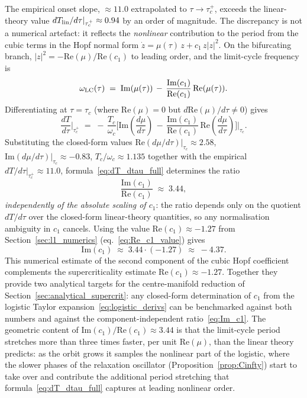 \documentclass[sn-mathphys,Numbered]{sn-jnl}
\theoremstyle{thmstyleone}
\theoremstyle{thmstyletwo}
\theoremstyle{thmstylethree}
\begin{document}
The empirical onset slope, $\approx 11.0$ extrapolated to
$\tau\to\tau_c^+$, exceeds the linear-theory value
$dT_{\rm lin}/d\tau|_{\tau_c^+}\approx 0.94$ by an order of
magnitude. The discrepancy is not a numerical artefact: it reflects the
\emph{nonlinear} contribution to the period from the cubic terms in the
Hopf normal form $\dot{z}=\mu(\tau)\,z + c_1\,z|z|^2$. On the bifurcating
branch, $|z|^2=-\mathrm{Re}(\mu)/\mathrm{Re}(c_1)$ to leading order, and
the limit-cycle frequency is
\begin{equation}
\omega_{\rm LC}(\tau) \;=\; \mathrm{Im}(\mu(\tau))
   \,-\, \frac{\mathrm{Im}(c_1)}{\mathrm{Re}(c_1)}\,\mathrm{Re}(\mu(\tau)).
\label{eq:omega_LC}
\end{equation}
Differentiating at $\tau=\tau_c$ (where $\mathrm{Re}(\mu)=0$ but
$d\mathrm{Re}(\mu)/d\tau\neq 0$) gives
\begin{equation}
\frac{dT}{d\tau}\bigg|_{\tau_c^{+}}
\;=\; -\,\frac{T_c}{\omega_c}
\biggl[\mathrm{Im}\!\left(\frac{d\mu}{d\tau}\right)
       \,-\, \frac{\mathrm{Im}(c_1)}{\mathrm{Re}(c_1)}\,
       \mathrm{Re}\!\left(\frac{d\mu}{d\tau}\right)\biggr]
\bigg|_{\tau_c}.
\label{eq:dT_dtau_full}
\end{equation}
Substituting the closed-form values
$\mathrm{Re}(d\mu/d\tau)|_{\tau_c}\approx 2.58$,
$\mathrm{Im}(d\mu/d\tau)|_{\tau_c}\approx-0.83$, $T_c/\omega_c\approx 1.135$
together with the empirical $dT/d\tau|_{\tau_c^+}\approx 11.0$,
formula~\eqref{eq:dT_dtau_full} determines the ratio
\begin{equation}
\frac{\mathrm{Im}(c_1)}{\mathrm{Re}(c_1)} \;\approx\; 3.44,
\label{eq:Im_c1}
\end{equation}
\emph{independently of the absolute scaling of $c_1$}: the ratio
depends only on the quotient $dT/d\tau$ over the closed-form
linear-theory quantities, so any normalisation ambiguity in $c_1$
cancels. Using the value $\mathrm{Re}(c_1)\approx -1.27$ from
Section~\ref{sec:l1_numerics} (eq.~\eqref{eq:Re_c1_value}) gives
\begin{equation}
\mathrm{Im}(c_1) \;\approx\; 3.44\cdot(-1.27) \;\approx\; -4.37.
\label{eq:Im_c1_value}
\end{equation}
This numerical estimate of the second component of the cubic Hopf
coefficient complements the supercriticality estimate
$\mathrm{Re}(c_1)\approx-1.27$. Together they provide two analytical
targets for the centre-manifold reduction of
Section~\ref{sec:analytical_supercrit}: any closed-form determination of
$c_1$ from the logistic Taylor expansion~\eqref{eq:logistic_derivs} can
be benchmarked against both numbers and against the
component-independent ratio~\eqref{eq:Im_c1}. The geometric content of
$\mathrm{Im}(c_1)/\mathrm{Re}(c_1)\approx 3.44$ is that the
limit-cycle period stretches more than three times faster, per unit
$\mathrm{Re}(\mu)$, than the linear theory predicts: as the orbit
grows it samples the nonlinear part of the logistic, where the slower
phases of the relaxation oscillator
(Proposition~\ref{prop:Cinfty}) start to take over and contribute the
additional period stretching that formula~\eqref{eq:dT_dtau_full}
captures at leading nonlinear order.
\end{document}
